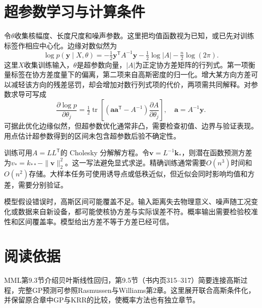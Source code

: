 \section{超参数学习与计算条件}
令$\theta$收集核幅度、长度尺度和噪声参数。这里把均值函数视为已知，或已先对训练标签作相应中心化。边缘对数似然为
\begin{equation}
 \log p(\bm y\mid X,\theta)
 =-\tfrac12\bm y^{\mathsf T}A^{-1}\bm y
 -\tfrac12\log|A|-\tfrac n2\log(2\pi).
\end{equation}
这里$X$收集训练输入，$\theta$是超参数向量，$|A|$为正定协方差矩阵的行列式。第一项衡量标签在协方差度量下的偏离，第二项来自高斯密度的归一化。增大某方向方差可以减轻该方向的残差惩罚，却会增加对数行列式项的代价，两项需共同解释。对参数求导可写成
\begin{equation}
 \frac{\partial\log p}{\partial\theta_j}
 =\tfrac12\operatorname{tr}\left[
 (\bm a\bm a^{\mathsf T}-A^{-1})\frac{\partial A}{\partial\theta_j}\right],
 \quad\bm a=A^{-1}\bm y.
\end{equation}
可据此优化边缘似然，但超参数优化通常非凸，需要检查初值、边界与验证表现。用点估计超参数得到的区间未包含超参数后验不确定性。

训练可用$A=LL^{\mathsf T}$的 Cholesky 分解解方程。令$\bm v=L^{-1}\bm k_*$，则潜在函数预测方差为$v_*=k_{**}-\|\bm v\|_2^2$。这一写法避免显式求逆。精确训练通常需要$O(n^3)$时间和$O(n^2)$存储。大样本任务可使用诱导点或低秩近似，但近似会同时影响均值和方差，需要分别验证。

模型假设错误时，高斯区间可能覆盖不足。输入距离失去物理意义、噪声随工况变化或数据来自新设备，都可能使核协方差与实际误差不符。概率输出需要检验校准性和区间覆盖率。模型给出方差不等于方差已经可信。

\section{阅读依据}
MML第9.3节介绍贝叶斯线性回归，第9.5节（书内页315--317）简要连接高斯过程，完整GP预测可参照Rasmussen与Williams第2章。这里展开联合高斯条件化，并保留原合章中GP与KRR的比较，使概率方法也有独立章节。
